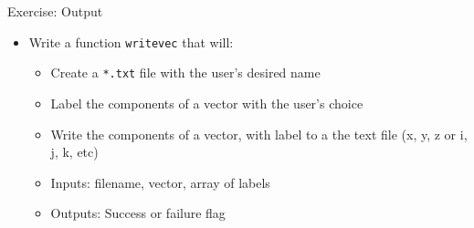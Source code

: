 \documentclass[11pt,professionalfonts]{beamer}
\begin{document}
\begin{frame}{Exercise: Output}
    \begin{itemize}
        \item Write a function \texttt{writevec} that will:
            \begin{itemize}
                \item Create a \texttt{*.txt} file with the user's desired name
                \item Label the components of a vector with the user's choice 
                \item Write the components of a vector, with label to a the text file (x, y, z or i, j, k, etc)
                \item Inputs: filename, vector, array of labels
                \item Outputs: Success or failure flag
            \end{itemize}
    \end{itemize}
\end{frame}
\end{document}
